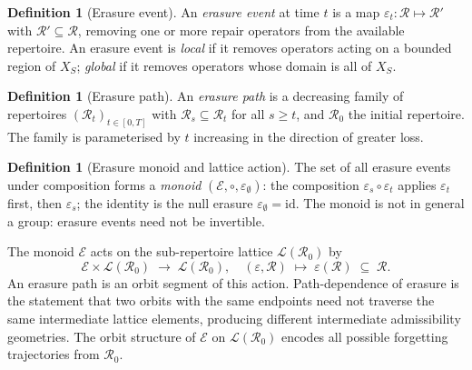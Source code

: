 \documentclass[12pt, oneside]{article}
\theoremstyle{plain}
\theoremstyle{definition}
\newtheorem{definition}[theorem]{Definition}
\theoremstyle{remark}
\newcommand{\Rt}{\mathcal{R}_t}
\newcommand{\Rzero}{\mathcal{R}_0}
\newcommand{\Xsub}{X_S}
\begin{document}
\begin{definition}[Erasure event]
  An \emph{erasure event} at time $t$ is a map
  $\varepsilon_t : \mathcal{R} \mapsto \mathcal{R}'$ with
  $\mathcal{R}' \subseteq \mathcal{R}$, removing one or more repair
  operators from the available repertoire.
  An erasure event is \emph{local} if it removes operators acting
  on a bounded region of $\Xsub$; \emph{global} if it removes
  operators whose domain is all of $\Xsub$.
\end{definition}

\begin{definition}[Erasure path]
  An \emph{erasure path} is a decreasing family of repertoires
  $(\Rt)_{t \in [0,T]}$ with $\mathcal{R}_s \subseteq \mathcal{R}_t$
  for all $s \geq t$, and $\mathcal{R}_0$ the initial repertoire.
  The family is parameterised by $t$ increasing in the direction of
  greater loss.
\end{definition}

\begin{definition}[Erasure monoid and lattice action]
  The set of all erasure events under composition forms a
  \emph{monoid} $(\mathcal{E}, \circ, \varepsilon_\emptyset)$:
  the composition $\varepsilon_s \circ \varepsilon_t$ applies
  $\varepsilon_t$ first, then $\varepsilon_s$;
  the identity is the null erasure $\varepsilon_\emptyset =
  \mathrm{id}$.
  The monoid is not in general a group: erasure events need not
  be invertible.

  The monoid $\mathcal{E}$ acts on the sub-repertoire lattice
  $\mathcal{L}(\Rzero)$ by
  \[
    \mathcal{E} \times \mathcal{L}(\Rzero)
    \;\longrightarrow\; \mathcal{L}(\Rzero),
    \quad
    (\varepsilon, \mathcal{R}) \;\mapsto\; \varepsilon(\mathcal{R})
    \;\subseteq\; \mathcal{R}.
  \]
  An erasure path is an orbit segment of this action.
  Path-dependence of erasure is the statement that two orbits with
  the same endpoints need not traverse the same intermediate
  lattice elements, producing different intermediate admissibility
  geometries.
  The orbit structure of $\mathcal{E}$ on $\mathcal{L}(\Rzero)$
  encodes all possible forgetting trajectories from $\Rzero$.
\end{definition}
\end{document}
